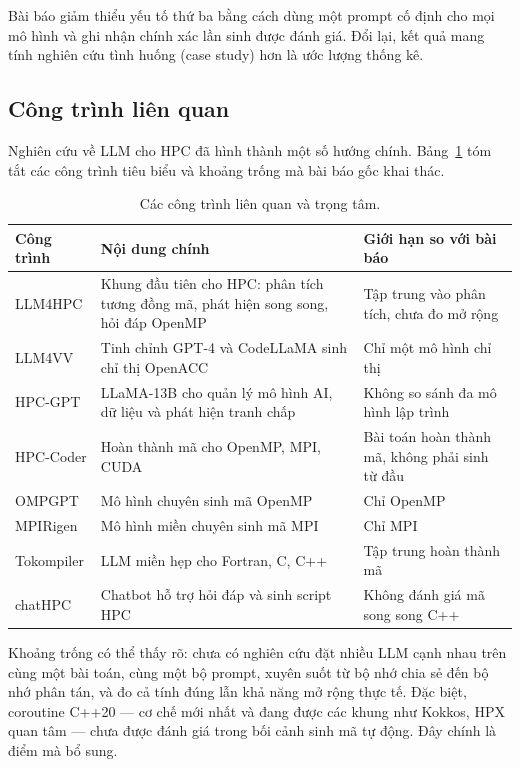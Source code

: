 Bài báo giảm thiểu yếu tố thứ ba bằng cách dùng một prompt cố định cho mọi mô
hình và ghi nhận chính xác lần sinh được đánh giá. Đổi lại, kết quả mang tính
nghiên cứu tình huống (case study) hơn là ước lượng thống kê.

\subsection{Công trình liên quan}

Nghiên cứu về LLM cho HPC đã hình thành một số hướng chính. Bảng~\ref{tab:related}
tóm tắt các công trình tiêu biểu và khoảng trống mà bài báo gốc khai thác.

\begin{table}[H]
\centering
\small
\caption{Các công trình liên quan và trọng tâm.}
\label{tab:related}
\begin{tabularx}{\textwidth}{@{}p{3.0cm} X p{3.4cm}@{}}
\toprule
\textbf{Công trình} & \textbf{Nội dung chính} & \textbf{Giới hạn so với bài báo} \\
\midrule
LLM4HPC \cite{chen2023llm4hpc} & Khung đầu tiên cho HPC: phân tích tương đồng mã, phát hiện song song, hỏi đáp OpenMP & Tập trung vào phân tích, chưa đo mở rộng \\
LLM4VV \cite{munley2024llm4vv} & Tinh chỉnh GPT-4 và CodeLLaMA sinh chỉ thị OpenACC & Chỉ một mô hình chỉ thị \\
HPC-GPT \cite{ding2023hpcgpt} & LLaMA-13B cho quản lý mô hình AI, dữ liệu và phát hiện tranh chấp & Không so sánh đa mô hình lập trình \\
HPC-Coder \cite{nichols2024hpccoder,chaturvedi2025hpccoderv2} & Hoàn thành mã cho OpenMP, MPI, CUDA & Bài toán hoàn thành mã, không phải sinh từ đầu \\
OMPGPT \cite{chen2024ompgpt} & Mô hình chuyên sinh mã OpenMP & Chỉ OpenMP \\
MPIRigen \cite{schneider2024mpirigen} & Mô hình miền chuyên sinh mã MPI & Chỉ MPI \\
Tokompiler \cite{kadosh2023tokompiler} & LLM miền hẹp cho Fortran, C, C++ & Tập trung hoàn thành mã \\
chatHPC \cite{yin2025chathpc} & Chatbot hỗ trợ hỏi đáp và sinh script HPC & Không đánh giá mã song song C++ \\
\bottomrule
\end{tabularx}
\end{table}

Khoảng trống có thể thấy rõ: chưa có nghiên cứu đặt nhiều LLM cạnh nhau trên
cùng một bài toán, cùng một bộ prompt, xuyên suốt từ bộ nhớ chia sẻ đến bộ nhớ
phân tán, và đo cả tính đúng lẫn khả năng mở rộng thực tế. Đặc biệt, coroutine
C++20 — cơ chế mới nhất và đang được các khung như Kokkos, HPX quan tâm — chưa
được đánh giá trong bối cảnh sinh mã tự động. Đây chính là điểm mà
\cite{diehl2026} bổ sung.
